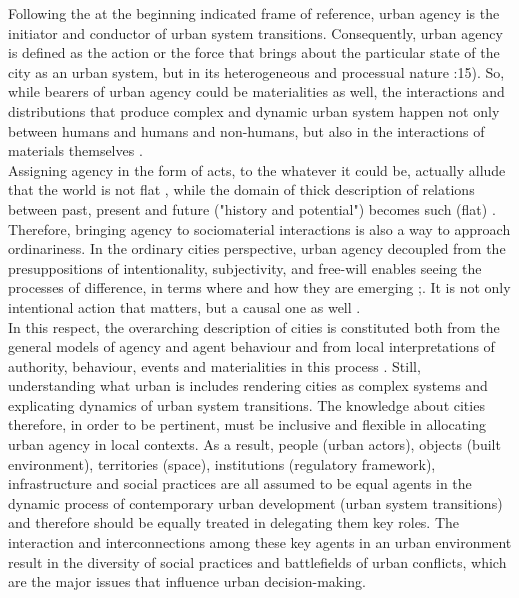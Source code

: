 \documentclass[11pt]{report}
\begin{document}
Following the at the beginning indicated frame of reference, urban agency is the initiator and conductor of urban system transitions.
Consequently, urban agency is defined as the action or the force that brings about the particular state of the city as an urban system, but in its heterogeneous and processual nature \cite{Farías (2011}:15). 
So, while bearers of urban agency could be materialities as well, the interactions and distributions that produce complex and dynamic urban system happen not only between humans and humans and non-humans, but also in the interactions of materials themselves \cite{Manuel De Landa (2011)}.
\\

Assigning agency in the form of acts, to the whatever it could be, actually allude that the world is not flat \href{Roy}{\citealt{roy_21st-century_2009}}, while the domain of thick description of relations between past, present and future ("history and potential") becomes such (flat) \href{Rankin}{\citealt{rankin_assemblage_2011}}.
Therefore, bringing agency to sociomaterial interactions is also a way to approach ordinariness. In the ordinary cities perspective, urban agency decoupled from the presuppositions of intentionality, subjectivity, and free-will enables seeing the processes of difference, in terms where and how they are emerging \href{Sayes}{\citealt{sayes_actor-network_2014}};\href{McFarlane}{\citealt{mcfarlane_assemblage_2011}}.
It is not only intentional action that matters, but a causal one as well  
\href{Sayes}{\citealt{sayes_actor-network_2014}}.
\\

In this respect, the overarching description of cities is constituted both from the general models of agency and agent behaviour and from local interpretations of authority, behaviour, events and materialities in this process \href{Healey}{\cite{healey_institutional_1992}}.
Still, understanding what urban is includes rendering cities as complex systems and explicating dynamics of urban  system transitions.
The knowledge about cities therefore, in order to be pertinent, must be inclusive and flexible in allocating urban agency in local contexts. 
As a result, people (urban actors), objects (built environment), territories (space), institutions (regulatory framework), infrastructure and social practices are all assumed to be equal agents in the dynamic process of contemporary urban development (urban system transitions) and therefore should be equally treated in delegating them key roles.
The interaction and interconnections among these key agents in an urban environment result in the diversity of social practices and battlefields of urban conflicts, which are the major issues that influence urban decision-making. 
\end{document}
